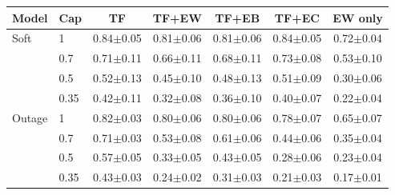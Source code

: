 \begin{tabular}{llccccc}
\toprule
Model & Cap & TF & TF+EW & TF+EB & TF+EC & EW only \\
\midrule
Soft & 1 & 0.84$\pm$0.05 & 0.81$\pm$0.06 & 0.81$\pm$0.06 & 0.84$\pm$0.05 & 0.72$\pm$0.04 \\
 & 0.7 & 0.71$\pm$0.11 & 0.66$\pm$0.11 & 0.68$\pm$0.11 & 0.73$\pm$0.08 & 0.53$\pm$0.10 \\
 & 0.5 & 0.52$\pm$0.13 & 0.45$\pm$0.10 & 0.48$\pm$0.13 & 0.51$\pm$0.09 & 0.30$\pm$0.06 \\
 & 0.35 & 0.42$\pm$0.11 & 0.32$\pm$0.08 & 0.36$\pm$0.10 & 0.40$\pm$0.07 & 0.22$\pm$0.04 \\
\midrule
Outage & 1 & 0.82$\pm$0.03 & 0.80$\pm$0.06 & 0.80$\pm$0.06 & 0.78$\pm$0.07 & 0.65$\pm$0.07 \\
 & 0.7 & 0.71$\pm$0.03 & 0.53$\pm$0.08 & 0.61$\pm$0.06 & 0.44$\pm$0.06 & 0.35$\pm$0.04 \\
 & 0.5 & 0.57$\pm$0.05 & 0.33$\pm$0.05 & 0.43$\pm$0.05 & 0.28$\pm$0.06 & 0.23$\pm$0.04 \\
 & 0.35 & 0.43$\pm$0.03 & 0.24$\pm$0.02 & 0.31$\pm$0.03 & 0.21$\pm$0.03 & 0.17$\pm$0.01 \\
\bottomrule
\end{tabular}
